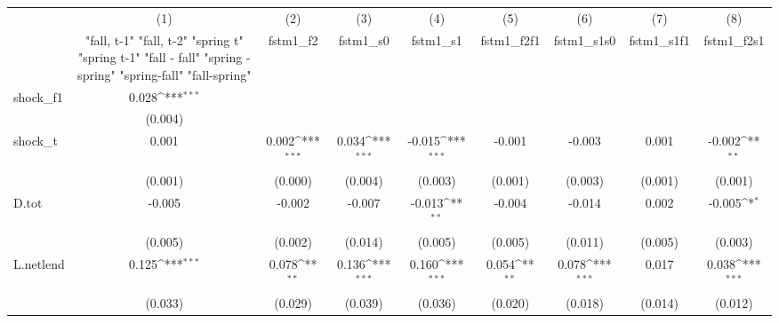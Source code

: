 {
\def\sym#1{\ifmmode^{#1}\else\(^{#1}\)\fi}
\begin{tabular}{l*{8}{c}}
\toprule
            &\multicolumn{1}{c}{(1)}&\multicolumn{1}{c}{(2)}&\multicolumn{1}{c}{(3)}&\multicolumn{1}{c}{(4)}&\multicolumn{1}{c}{(5)}&\multicolumn{1}{c}{(6)}&\multicolumn{1}{c}{(7)}&\multicolumn{1}{c}{(8)}\\
            &\multicolumn{1}{c}{  "fall, t-1" "fall, t-2" "spring t" "spring t-1"  "fall - fall" "spring - spring" "spring-fall" "fall-spring" }&\multicolumn{1}{c}{fstm1\_f2}&\multicolumn{1}{c}{fstm1\_s0}&\multicolumn{1}{c}{fstm1\_s1}&\multicolumn{1}{c}{fstm1\_f2f1}&\multicolumn{1}{c}{fstm1\_s1s0}&\multicolumn{1}{c}{fstm1\_s1f1}&\multicolumn{1}{c}{fstm1\_f2s1}\\
\midrule
shock\_f1    &       0.028\sym{***}&                     &                     &                     &                     &                     &                     &                     \\
            &     (0.004)         &                     &                     &                     &                     &                     &                     &                     \\
\addlinespace
shock\_t     &       0.001         &       0.002\sym{***}&       0.034\sym{***}&      -0.015\sym{***}&      -0.001         &      -0.003         &       0.001         &      -0.002\sym{**} \\
            &     (0.001)         &     (0.000)         &     (0.004)         &     (0.003)         &     (0.001)         &     (0.003)         &     (0.001)         &     (0.001)         \\
\addlinespace
D.tot       &      -0.005         &      -0.002         &      -0.007         &      -0.013\sym{**} &      -0.004         &      -0.014         &       0.002         &      -0.005\sym{*}  \\
            &     (0.005)         &     (0.002)         &     (0.014)         &     (0.005)         &     (0.005)         &     (0.011)         &     (0.005)         &     (0.003)         \\
\addlinespace
L.netlend   &       0.125\sym{***}&       0.078\sym{**} &       0.136\sym{***}&       0.160\sym{***}&       0.054\sym{**} &       0.078\sym{***}&       0.017         &       0.038\sym{***}\\
            &     (0.033)         &     (0.029)         &     (0.039)         &     (0.036)         &     (0.020)         &     (0.018)         &     (0.014)         &     (0.012)         \\

\end{tabular}}

